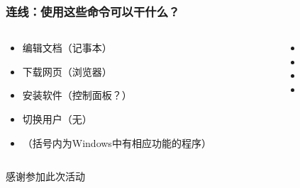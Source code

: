 \begin{frame} [fragile]
	\frametitle{连线：使用这些命令可以干什么？}
	\linespread{1.5}
	\begin{columns}[T]
		\begin{column}[T]{.5\textwidth}
			\begin{itemize}
			\item 编辑文档（记事本）
			\item 下载网页（浏览器）
			\item 安装软件（控制面板？）
			\item 切换用户（无）
			\item （括号内为Windows中有相应功能的程序）
			\end{itemize}
		\end{column}
		\begin{column}[T]{.5\textwidth}
			\begin{itemize}
			\item {}
			\item {}
			\item {}
			\item {}
			\end{itemize}
		\end{column}
	\end{columns}
\end{frame}

\PreLastFrame
\begin{frame}
	\centerline{\fontsize{32}{32}\selectfont 感谢参加此次活动}
\end{frame}

\newpage


